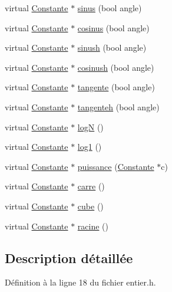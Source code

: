 \begin{DoxyCompactItemize}
\item 
virtual \hyperlink{class_constante}{\-Constante} $\ast$ \hyperlink{class_entier_a1c4613f03f0c7818d1a092714b9077bd}{sinus} (bool angle)
\item 
virtual \hyperlink{class_constante}{\-Constante} $\ast$ \hyperlink{class_entier_a77e37975ae8575ac9a41d4e41688429a}{cosinus} (bool angle)
\item 
virtual \hyperlink{class_constante}{\-Constante} $\ast$ \hyperlink{class_entier_a1b87da533d3a1a7c75c327526f3492c0}{sinush} (bool angle)
\item 
virtual \hyperlink{class_constante}{\-Constante} $\ast$ \hyperlink{class_entier_ae7fbbe73ca85a3bad129d2285f7485aa}{cosinush} (bool angle)
\item 
virtual \hyperlink{class_constante}{\-Constante} $\ast$ \hyperlink{class_entier_ae07a386db45cb20dddbb3dc8738a4115}{tangente} (bool angle)
\item 
virtual \hyperlink{class_constante}{\-Constante} $\ast$ \hyperlink{class_entier_aa8d0a9958c7f7eaf38c60922e2716601}{tangenteh} (bool angle)
\item 
virtual \hyperlink{class_constante}{\-Constante} $\ast$ \hyperlink{class_entier_a4bc40041f47a027ef00d3e71869fdaf9}{log\-N} ()
\item 
virtual \hyperlink{class_constante}{\-Constante} $\ast$ \hyperlink{class_entier_abe28b3a25a9b179d36c35c7081638ab3}{log1} ()
\item 
virtual \hyperlink{class_constante}{\-Constante} $\ast$ \hyperlink{class_entier_ae789623eeda06e02ba54c14dab64c399}{puissance} (\hyperlink{class_constante}{\-Constante} $\ast$c)
\item 
virtual \hyperlink{class_constante}{\-Constante} $\ast$ \hyperlink{class_entier_ac93c2be5a977a38c560ee01eae5b9381}{carre} ()
\item 
virtual \hyperlink{class_constante}{\-Constante} $\ast$ \hyperlink{class_entier_ac4aa9142ca284291935f5e2880c3b612}{cube} ()
\item 
virtual \hyperlink{class_constante}{\-Constante} $\ast$ \hyperlink{class_entier_ae5459f97866c5240e8a1417f425b5a05}{racine} ()
\end{DoxyCompactItemize}


\subsection{\-Description détaillée}


\-Définition à la ligne 18 du fichier entier.\-h.



